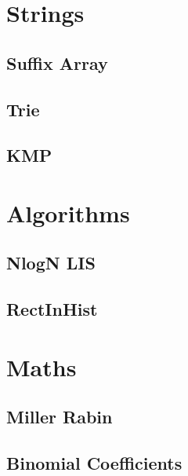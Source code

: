 \documentclass[twocolumn]{article}
\begin{document}
    \newpage
    \section{Strings}
        \subsection{Suffix Array}
        
        \subsection{Trie}
        
        \subsection{KMP}
        


    \newpage
    \section{Algorithms}
        \subsection{NlogN LIS}
        
        \subsection{RectInHist}
        

    \newpage
    \section{Maths}
        \subsection{Miller Rabin}
        
        \subsection{Binomial Coefficients}
        
        
\end{document}
